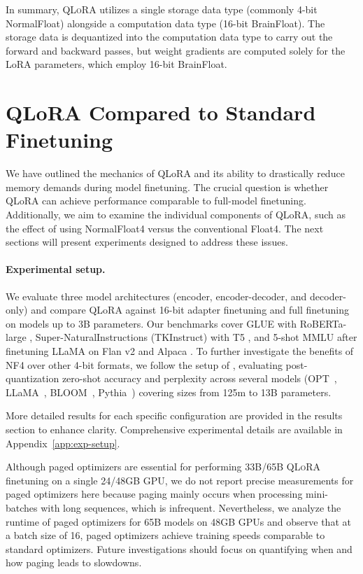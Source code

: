 In summary, \textsc{QLoRA} utilizes a single storage data type (commonly 4-bit NormalFloat) alongside a computation data type (16-bit BrainFloat). The storage data is dequantized into the computation data type to carry out the forward and backward passes, but weight gradients are computed solely for the LoRA parameters, which employ 16-bit BrainFloat.

\section{QLoRA Compared to Standard Finetuning}
\label{sec:comp_to_std}

We have outlined the mechanics of QLoRA and its ability to drastically reduce memory demands during model finetuning. The crucial question is whether QLoRA can achieve performance comparable to full-model finetuning. Additionally, we aim to examine the individual components of QLoRA, such as the effect of using NormalFloat4 versus the conventional Float4. The next sections will present experiments designed to address these issues.

\paragraph{Experimental setup.} We evaluate three model architectures (encoder, encoder-decoder, and decoder-only) and compare QLoRA against 16-bit adapter finetuning and full finetuning on models up to 3B parameters. Our benchmarks cover GLUE \citep{wang2018glue} with RoBERTa-large \citep{liu2019roberta}, Super-NaturalInstructions (TKInstruct) \citep{wang2022super} with T5 \citep{t5}, and 5-shot MMLU \citep{hendrycksmeasuring} after finetuning LLaMA on Flan v2 \citep{longpre2023flan} and Alpaca \citep{alpaca}. To further investigate the benefits of NF4 over other 4-bit formats, we follow the setup of \citet{dettmers2022case}, evaluating post-quantization zero-shot accuracy and perplexity across several models (OPT~\citep{zhang2022opt}, LLaMA~\citep{touvron2023llama}, BLOOM~\citep{scao2022bloom}, Pythia~\citep{biderman2023pythia}) covering sizes from 125m to 13B parameters.

More detailed results for each specific configuration are provided in the results section to enhance clarity. Comprehensive experimental details are available in Appendix~\ref{app:exp-setup}.

Although paged optimizers are essential for performing 33B/65B \textsc{QLoRA} finetuning on a single 24/48GB GPU, we do not report precise measurements for paged optimizers here because paging mainly occurs when processing mini-batches with long sequences, which is infrequent. Nevertheless, we analyze the runtime of paged optimizers for 65B models on 48GB GPUs and observe that at a batch size of 16, paged optimizers achieve training speeds comparable to standard optimizers. Future investigations should focus on quantifying when and how paging leads to slowdowns.

